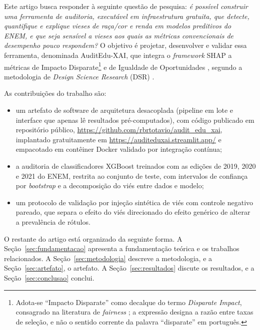 Este artigo busca responder à seguinte questão de pesquisa: \textit{é possível construir uma ferramenta de auditoria, executável em infraestrutura gratuita, que detecte, quantifique e explique vieses de raça/cor e renda em modelos preditivos do ENEM, e que seja sensível a vieses aos quais as métricas convencionais de desempenho pouco respondem?} O objetivo é projetar, desenvolver e validar essa ferramenta, denominada AuditEdu-XAI, que integra o \textit{framework} SHAP \cite{lundberg2017unified} a métricas de Impacto Disparate\footnote{Adota-se ``Impacto Disparate'' como decalque do termo \textit{Disparate Impact}, consagrado na literatura de \textit{fairness} \cite{feldman2015certifying}; a expressão designa a razão entre taxas de seleção, e não o sentido corrente da palavra ``disparate'' em português.} \cite{feldman2015certifying} e de Igualdade de Oportunidades \cite{hardt2016equality}, segundo a metodologia de \textit{Design Science Research} (DSR) \cite{peffers2007design}.

As contribuições do trabalho são:
\begin{itemize}
    \item um artefato de software de arquitetura desacoplada (pipeline em lote e interface que apenas lê resultados pré-computados), com código publicado em repositório público, \url{https://github.com/rbrtotavio/audit_edu_xai}, implantado gratuitamente em \url{https://auditeduxai.streamlit.app/} e empacotado em contêiner Docker validado por integração contínua;
    \item a auditoria de classificadores XGBoost treinados com as edições de 2019, 2020 e 2021 do ENEM, restrita ao conjunto de teste, com intervalos de confiança por \textit{bootstrap} e a decomposição do viés entre dados e modelo;
    \item um protocolo de validação por injeção sintética de viés com controle negativo pareado, que separa o efeito do viés direcionado do efeito genérico de alterar a prevalência de rótulos.
\end{itemize}

O restante do artigo está organizado da seguinte forma. A Seção~\ref{sec:fundamentacao} apresenta a fundamentação teórica e os trabalhos relacionados. A Seção~\ref{sec:metodologia} descreve a metodologia, e a Seção~\ref{sec:artefato}, o artefato. A Seção~\ref{sec:resultados} discute os resultados, e a Seção~\ref{sec:conclusao} conclui.
